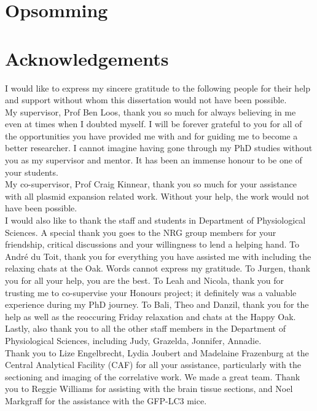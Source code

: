\chapter{Opsomming}
\newpage

\chapter{Acknowledgements}

\noindent
I would like to express my sincere gratitude to the following people for their help and support without whom this dissertation would not
have been possible. \\

\noindent
My supervisor, Prof Ben Loos, thank you so much for always believing in me even at times when I doubted myself. I will be forever grateful to you for all of the opportunities you have provided me with and for guiding me to become a better researcher. I cannot imagine having gone through my PhD studies without you as my supervisor and mentor. It has been an immense honour to be one of your students. \\

\noindent
My co-supervisor, Prof Craig Kinnear, thank you so much for your assistance with all plasmid expansion related work. Without your help, the work would not have been possible.\\

\noindent
I would also like to thank the staff and students in Department of Physiological Sciences. A special thank you goes to the NRG group members for your friendship, critical discussions and your willingness to lend a helping hand. To Andr{\'e} du Toit, thank you for everything you have assisted me with including the relaxing chats at the Oak. Words cannot express my gratitude. To Jurgen, thank you for all your help, you are the best. To Leah and Nicola, thank you for trusting me to co-supervise your Honours project; it definitely was a valuable experience during my PhD journey. To Bali, Theo and Danzil, thank you for the help as well as the reoccuring Friday relaxation and chats at the Happy Oak. Lastly, also thank you to all the other staff members in the Department of Physiological Sciences, including Judy, Grazelda, Jonnifer, Annadie. \\

\noindent
Thank you to Lize Engelbrecht, Lydia Joubert and Madelaine Frazenburg at the Central Analytical Facility (CAF) for all your assistance, particularly with the sectioning and imaging of the correlative work. We made a great team. Thank you to Reggie Williams for assisting with the brain tissue sections, and Noel Markgraff for the assistance with the GFP-LC3 mice. \\

